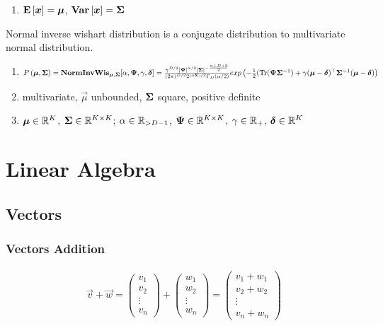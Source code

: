 \begin{description}[leftmargin=0cm]
\begin{enumerate}
		\item $\mathbf{E}\left[\boldsymbol{x}\right]=\boldsymbol{\mu}$, $\mathbf{Var}\left[\boldsymbol{x}\right]=\mathbf{\Sigma}$
	\end{enumerate}
\item[Normal Inverse Wishart] Normal inverse wishart distribution is a conjugate distribution to multivariate normal distribution.
	\begin{enumerate}
		\item $\P{\vec{\mu},\cov}=\NIW_{\vec{\mu},\cov}[\al,\vec{\Ps},\ga,\vec{\de}] \\ =\frac{\ga^{D/2}\det{\vec{\Ps}}^{\al/2}\det{\cov}^{-\frac{\al+D+2}{2}}}{(2\pi)^{D/2}2^{(\al\cov)/2}\Ga_D(\al/2)}\e{-\frac{1}{2}(\Tr(\vec{\Ps}\cov\inv)+\ga(\vec{\mu}-\vec{\de})\T\cov\inv(\vec{\mu}-\vec{\de})}$
		\item multivariate, $\vec{\mu}$ unbounded, $\mathbf{\Sigma}$ square, positive definite
		\item $\boldsymbol{\mu} \in \mathbb{R}^K$, $\mathbf{\Sigma} \in \mathbb{R}^{K \times K}$; $\alpha \in \mathbb{R}_{>D-1}$, $\boldsymbol{\Psi} \in \mathbb{R}^{K \times K}$, $\gamma \in \mathbb{R}_+$, $\boldsymbol{\delta} \in \mathbb{R}^K$
	\end{enumerate}
\end{description}

\section{Linear Algebra}
\label{section2.2}

\subsection{Vectors}

\subsubsection*{Vectors Addition}

\begin{align*}
	\vec{v}+\vec{w}=\begin{pmatrix}
	v_1 \\ v_2 \\ \vdots \\ v_n
	\end{pmatrix}+\begin{pmatrix}
	w_1 \\ w_2 \\ \vdots \\ w_n
	\end{pmatrix}=\begin{pmatrix}
	v_1+w_1 \\ v_2+w_2 \\ \vdots \\ v_n+w_n
	\end{pmatrix}
\end{align*}

